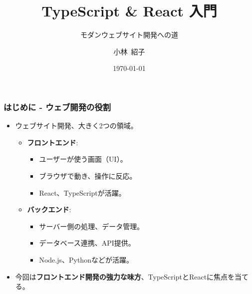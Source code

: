 \documentclass{beamer}
\title{TypeScript \& React 入門}
\subtitle{モダンウェブサイト開発への道}
\author{小林\ 紹子} %
\date{\today}
\begin{document}
\begin{frame}
    \titlepage
\end{frame}

\begin{frame}
    \frametitle{はじめに - ウェブ開発の役割}
    \begin{itemize}
        \item ウェブサイト開発、大きく2つの領域。
        \begin{itemize}
            \item \textbf{フロントエンド}:
                \begin{itemize}
                    \item ユーザーが使う画面（UI）。
                    \item ブラウザで動き、操作に反応。
                    \item React、TypeScriptが活躍。
                \end{itemize}
            \item \textbf{バックエンド}:
                \begin{itemize}
                    \item サーバー側の処理、データ管理。
                    \item データベース連携、API提供。
                    \item Node.js、Pythonなどが活躍。
                \end{itemize}
        \end{itemize}
        \item 今回は\textbf{フロントエンド開発の強力な味方}、TypeScriptとReactに焦点を当てる。
    \end{itemize}
\end{frame}
\end{document}

